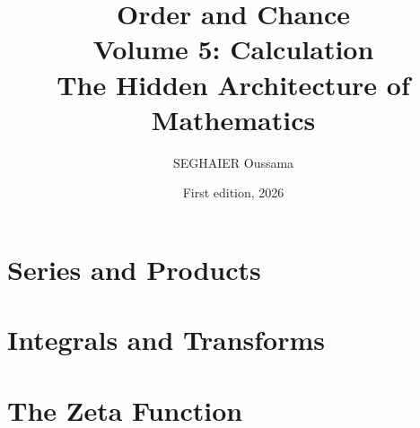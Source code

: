 \documentclass[11pt,openany]{book}
\title{\Huge\textbf{Order and Chance}\\[0.4em]\LARGE Volume 5: Calculation\\[0.6em]
\Large The Hidden Architecture of Mathematics}
\author{SEGHAIER Oussama}
\date{First edition, 2026}
\begin{document}
\frontmatter
\makecover
\maketitle

\tableofcontents

\mainmatter

\part{Series and Products}



\part{Integrals and Transforms}






\part{The Zeta Function}





\backmatter



\end{document}
